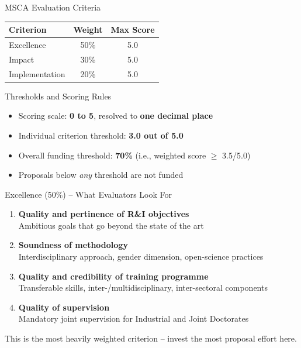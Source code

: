 \documentclass[aspectratio=169]{beamer}
\newcommand{\highlight}[1]{\textcolor{euBlue}{\textbf{#1}}}
\begin{document}
\begin{frame}{MSCA Evaluation Criteria}
\renewcommand{\arraystretch}{1.35}
\begin{center}
\begin{tabular}{@{}l c c@{}}
  \toprule
  \textbf{Criterion} & \textbf{Weight} & \textbf{Max Score} \\
  \midrule
  \rowcolor{euLightBlue}
  Excellence        & 50\% & 5.0 \\
  Impact            & 30\% & 5.0 \\
  \rowcolor{euLightBlue}
  Implementation    & 20\% & 5.0 \\
  \bottomrule
\end{tabular}
\end{center}
\vspace{6pt}
\begin{block}{Thresholds and Scoring Rules}
\begin{itemize}
  \item Scoring scale: \textbf{0 to 5}, resolved to \highlight{one decimal place}
  \item Individual criterion threshold: \highlight{3.0 out of 5.0}
  \item Overall funding threshold: \textbf{70\%} (i.e., weighted score $\geq$ 3.5/5.0)
  \item Proposals below \emph{any} threshold are not funded
\end{itemize}
\end{block}
\end{frame}

\begin{frame}{Excellence (50\%) -- What Evaluators Look For}
\begin{enumerate}
  \item \highlight{Quality and pertinence of R\&I objectives}\\
        {\small Ambitious goals that go beyond the state of the art}
  \item \highlight{Soundness of methodology}\\
        {\small Interdisciplinary approach, gender dimension, open-science practices}
  \item \highlight{Quality and credibility of training programme}\\
        {\small Transferable skills, inter-/multidisciplinary, inter-sectoral components}
  \item \highlight{Quality of supervision}\\
        {\small Mandatory joint supervision for Industrial and Joint Doctorates}
\end{enumerate}
\vspace{6pt}
\textcolor{euBlue}{\small This is the most heavily weighted criterion -- invest the most proposal effort here.}
\end{frame}
\end{document}
